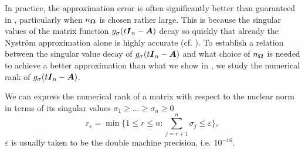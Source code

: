 In practice, the approximation error is often significantly better than guaranteed in , particularly when $n_{\boldsymbol{\Omega}}$ is chosen rather large. This is because the singular values of the matrix function $g_{\sigma}(t\boldsymbol{I}_n - \boldsymbol{A})$ decay so quickly that already the Nyström approximation alone is highly accurate (cf. ). To establish a relation between the singular value decay of $g_{\sigma}(t\boldsymbol{I}_n - \boldsymbol{A})$ and what choice of $n_{\boldsymbol{\Omega}}$ is needed to achieve a better approximation than what we show in , we study the numerical rank of $g_{\sigma}(t\boldsymbol{I}_n - \boldsymbol{A})$.

We can express the numerical rank of a matrix with respect to the nuclear norm in terms of its singular values $\sigma_1 \geq \dots \geq \sigma_n \geq 0$
\begin{equation}
    r_{\varepsilon} = \min \{1 \leq r \leq n: \sum_{j=r+1}^n \sigma_{j} \leq \varepsilon \},
    \label{equ:numerical-rank}
\end{equation}
$\varepsilon$ is usually taken to be the double machine precision, i.e. $10^{-16}$. 

%

